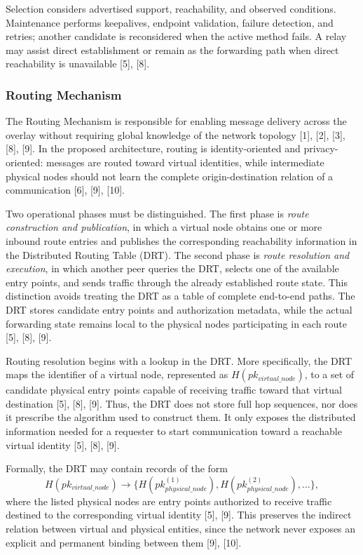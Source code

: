 \documentclass[12pt,a4paper]{article}
\begin{document}
Selection considers advertised support, reachability, and observed conditions. Maintenance performs keepalives, endpoint validation, failure detection, and retries; another candidate is reconsidered when the active method fails. A relay may assist direct establishment or remain as the forwarding path when direct reachability is unavailable [5], [8].



\subsubsection{Routing Mechanism}

The Routing Mechanism is responsible for enabling message delivery across the overlay without requiring global knowledge of the network topology [1], [2], [3], [8], [9]. In the proposed architecture, routing is identity-oriented and privacy-oriented: messages are routed toward virtual identities, while intermediate physical nodes should not learn the complete origin-destination relation of a communication [6], [9], [10].

Two operational phases must be distinguished. The first phase is \textit{route construction and publication}, in which a virtual node obtains one or more inbound route entries and publishes the corresponding reachability information in the Distributed Routing Table (DRT). The second phase is \textit{route resolution and execution}, in which another peer queries the DRT, selects one of the available entry points, and sends traffic through the already established route state. This distinction avoids treating the DRT as a table of complete end-to-end paths. The DRT stores candidate entry points and authorization metadata, while the actual forwarding state remains local to the physical nodes participating in each route [5], [8], [9].

Routing resolution begins with a lookup in the DRT. More specifically, the DRT maps the identifier of a virtual node, represented as $H(pk_{virtual\_node})$, to a set of candidate physical entry points capable of receiving traffic toward that virtual destination [5], [8], [9]. Thus, the DRT does not store full hop sequences, nor does it prescribe the algorithm used to construct them. It only exposes the distributed information needed for a requester to start communication toward a reachable virtual identity [5], [8], [9].

\thesisdrttikz

Formally, the DRT may contain records of the form
\[
H(pk_{virtual\_node}) \rightarrow \{H(pk_{physical\_node}^{(1)}), H(pk_{physical\_node}^{(2)}), \dots\},
\]
where the listed physical nodes are entry points authorized to receive traffic destined to the corresponding virtual identity [5], [9]. This preserves the indirect relation between virtual and physical entities, since the network never exposes an explicit and permanent binding between them [9], [10].
\end{document}
